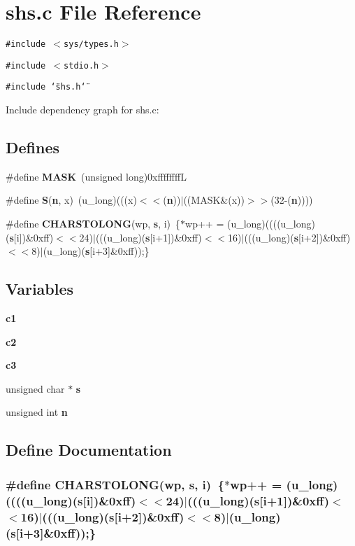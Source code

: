 \section{shs.c File Reference}
\label{shs_8c}


{\tt \#include $<$sys/types.h$>$}\par
{\tt \#include $<$stdio.h$>$}\par
{\tt \#include \char`\"{}shs.h\char`\"{}}\par


Include dependency graph for shs.c:\subsection*{Defines}
\begin{CompactItemize}
\item 
\#define {\bf MASK}\ (unsigned long)0xffffffff\-L
\item 
\#define {\bf S}({\bf n}, x)\ (u\_\-long)(((x)$<$$<$({\bf n}))$|$((MASK\&(x))$>$$>$(32-({\bf n}))))
\item 
\#define {\bf CHARSTOLONG}(wp, {\bf s}, i)\ \{$\ast$wp++ = (u\_\-long)((((u\_\-long)({\bf s}[i])\&0xff)$<$$<$24)$|$(((u\_\-long)({\bf s}[i+1])\&0xff)$<$$<$16)$|$(((u\_\-long)({\bf s}[i+2])\&0xff)$<$$<$8)$|$(u\_\-long)({\bf s}[i+3]\&0xff));\}
\end{CompactItemize}
\subsection*{Variables}
\begin{CompactItemize}
\item 
{\bf c1}
\item 
{\bf c2}
\item 
{\bf c3}
\item 
unsigned char $\ast$ {\bf s}
\item 
unsigned int {\bf n}
\end{CompactItemize}


\subsection{Define Documentation}
\subsubsection{\setlength{\rightskip}{0pt plus 5cm}\#define CHARSTOLONG(wp, {\bf s}, i)\ \{$\ast$wp++ = (u\_\-long)((((u\_\-long)({\bf s}[i])\&0xff)$<$$<$24)$|$(((u\_\-long)({\bf s}[i+1])\&0xff)$<$$<$16)$|$(((u\_\-long)({\bf s}[i+2])\&0xff)$<$$<$8)$|$(u\_\-long)({\bf s}[i+3]\&0xff));\}}\label{shs_8c_a2}


